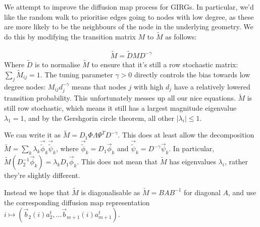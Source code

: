 We attempt to improve the diffusion map process for GIRGs. In particular, we'd like the random walk to prioritise edges going to nodes with low degree, as these are more likely to be the neighbours of the node in the underlying geometry. We do this by modifying the transition matrix $M$ to $\tilde{M}$ as follows:

\begin{align*}
  \tilde{M} = \tilde{D} M D^{-\gamma}
\end{align*}
Where $\tilde{D}$ is to normalise $\tilde{M}$ to ensure that it's still a row stochastic matrix: $\sum_j \tilde{M}_{ij} = 1$. The tuning parameter $\gamma > 0$ directly controls the bias towards low degree nodes: $M_{ij} d^{-\gamma}_j$ means that nodes $j$ with high $d_j$ have a relatively lowered transition probability.
This unfortunately messes up all our nice equations. $\tilde{M}$ is still row stochastic, which means it still has a largest magnitude eigenvalue $\lambda_1 = 1$, and by the Gershgorin circle theorem, all other $|\lambda_i| \leq 1$.

We can write it as $\tilde{M} = D_1 \Phi \Lambda \Psi^T D^{-\gamma}$. This does at least allow the decomposition $\tilde{M} = \sum_k \lambda_k \vec{\tilde{\phi}}_k \vec{\tilde{\psi}}_k$, where $\vec{\tilde{\phi}}_k = D_1 \vec{\phi}_k$ and $\vec{\tilde{\psi}}_k = D^{-\gamma} \vec{\psi}_k$. In particular, $\tilde{M} (D_2^{-1} \vec{\phi}_k) = \lambda_k D_1 \vec{\phi}_k$. This does not mean that $\tilde{M}$ has eigenvalues $\lambda_i$, rather they're slightly different.

Instead we hope that $\tilde{M}$ is diagonalisable as $\tilde{M} = BAB^{-1}$ for diagonal $A$, and use the corresponding diffusion map representation $i \mapsto (\vec{b}_2(i) a_2^t,... \vec{b}_{m+1}(i) a_{m+1}^t)$.








